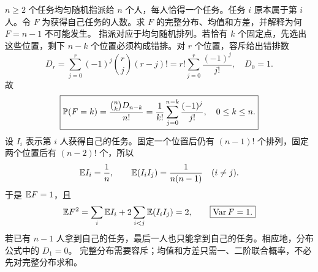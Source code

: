 $n\ge2$ 个任务均匀随机指派给 $n$ 个人，每人恰得一个任务。任务 $i$ 原本属于第 $i$ 人。令 $F$ 为获得自己任务的人数。求 $F$ 的完整分布、均值和方差，并解释为何 $F=n-1$ 不可能发生。
\solution 指派对应于均匀随机排列。若恰有 $k$ 个固定点，先选出这些位置，剩下 $n-k$ 个位置必须构成错排。对 $r$ 个位置，容斥给出错排数
\[
D_r=\sum_{j=0}^r(-1)^j\binom rj(r-j)!
=r!\sum_{j=0}^r\frac{(-1)^j}{j!},\quad D_0=1.
\]
故
\[
\boxed{\mathbb{P}(F=k)=\frac{\binom nkD_{n-k}}{n!}
=\frac1{k!}\sum_{j=0}^{n-k}\frac{(-1)^j}{j!},
\quad0\le k\le n.}
\]
设 $I_i$ 表示第 $i$ 人获得自己的任务。固定一个位置后仍有 $(n-1)!$ 个排列，固定两个位置后有 $(n-2)!$ 个，所以
\[
\mathbb{E} I_i=\frac1n,\qquad \mathbb{E}(I_iI_j)=\frac1{n(n-1)}\quad(i\ne j).
\]
于是 $\mathbb{E} F=1$，且
\[
\mathbb{E} F^2=\sum_i\mathbb{E} I_i+2\sum_{i<j}\mathbb{E}(I_iI_j)=2,
\qquad \boxed{\operatorname{Var} F=1.}
\]
若已有 $n-1$ 人拿到自己的任务，最后一人也只能拿到自己的任务。相应地，分布公式中的 $D_1=0$。
\insight 完整分布需要容斥；均值和方差只需一、二阶联合概率，不必先对完整分布求和。
